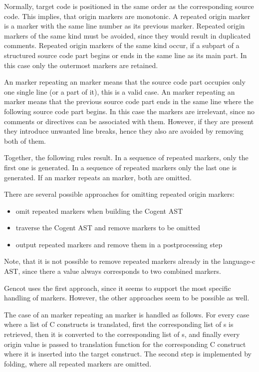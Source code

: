 Normally, target code is positioned in the same order as the corresponding source code. This implies, that
origin markers are monotonic. A repeated origin marker is a marker with the same line number as its previous marker.
Repeated origin markers of the same kind must be avoided, since they would result in duplicated comments.
Repeated origin markers of the same kind occur, if a subpart of a structured source code part begins or ends 
in the same line as its main part. In this case only the outermost markers are retained.

An  marker repeating an  marker means that the source code
part occupies only one single line (or a part of it), this is a valid case. 
An  marker repeating an  marker means that the previous source code
part ends in the same line where the following source code part begins. In this case the markers are
irrelevant, since no comments or directives can be associated with them. However, if they are
present they introduce unwanted line breaks, hence they also are avoided by removing both of them.

Together, the following rules result. In a sequence of repeated  markers, only the first one 
is generated. In a sequence of repeated  markers only the last one is generated.
If an  marker repeats an  marker, both are omitted.

There are several possible approaches for omitting repeated origin markers:
\begin{itemize}
\item omit repeated markers when building the Cogent AST
\item traverse the Cogent AST and remove markers to be omitted
\item output repeated markers and remove them in a postprocessing step
\end{itemize}
Note, that it is not possible to remove repeated markers already in the language-c AST, since there a 
value always corresponds to two combined markers.

Gencot uses the first approach, since it seems to support the most specific handling of markers. However, the other
approaches seem to be possible as well.

The case of an  marker repeating an  marker is handled as follows. For every case where 
a list of C constructs is translated, first the corresponding list of s is retrieved, then it is 
converted to the corresponding list of s, and finally every origin value is passed to translation function
for the corresponding C construct where it is inserted into the target construct. The second step is implemented by
folding, where all repeated markers are omitted.

